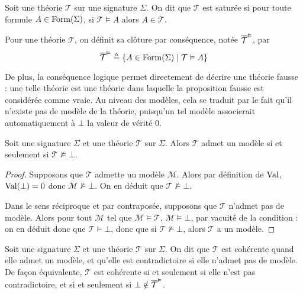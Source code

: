 \begin{definition}
  Soit une théorie $\mathcal T$ sur une signature $\Sigma$. On dit que
  $\mathcal T$ est saturée si pour toute formule $A\in\operatorname{Form}(\Sigma)$,
  si $\mathcal T\vDash A$ alors $A\in \mathcal T$.

  Pour une théorie $\mathcal T$, on définit sa clôture par conséquence, notée
  $\overline{\mathcal T}^{\vDash}$, par
  \[\overline{\mathcal T}^{\vDash} \triangleq \{ A \in \operatorname{Form}(\Sigma)
  \mid \mathcal T \vDash A\}\]
\end{definition}

De plus, la conséquence logique permet directement de décrire une théorie
\og fausse\fg{} : une telle théorie est une théorie dans laquelle la proposition
fausse est considérée comme vraie. Au niveau des modèles, cela se traduit par le
fait qu'il n'existe pas de modèle de la théorie, puisqu'un tel modèle
associerait automatiquement à $\bot$ la valeur de vérité $0$.

\begin{proposition}
  Soit une signature $\Sigma$ et une théorie $\mathcal T$ sur $\Sigma$. Alors
  $\mathcal T$ admet un modèle si et seulement si $\mathcal T \not\vDash \bot$.
\end{proposition}

\begin{proof}
  Supposons que $\mathcal T$ admette un modèle $\mathcal M$. Alors par
  définition de $\operatorname{Val}$, $\operatorname{Val}(\bot) = 0$ donc $\mathcal M\not\models \bot$. On
  en déduit que $\mathcal T\not\vDash\bot$.

  Dans le sens réciproque et par contraposée, supposons que $\mathcal T$ n'admet
  pas de modèle. Alors pour tout $\mathcal M$ tel que
  $\mathcal M\models \mathcal T$, $\mathcal M\models \bot$, par vacuité de la
  condition : on en déduit donc que $\mathcal T \vDash \bot$, donc que si
  $\mathcal T \not\vDash\bot$, alors $\mathcal T$ a un modèle.
\end{proof}

\begin{definition}
  Soit une signature $\Sigma$ et une théorie $\mathcal T$ sur $\Sigma$. On dit
  que $\mathcal T$ est cohérente quand elle admet un modèle, et qu'elle est
  contradictoire si elle n'admet pas de modèle. De façon équivalente,
  $\mathcal T$ est cohérente si et seulement si elle n'est pas contradictoire,
  et si et seulement si $\bot\notin\overline{\mathcal T}^{\vDash}$.
\end{definition}


